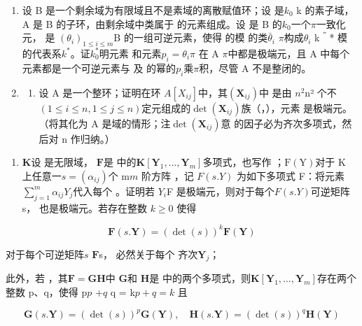 \begin{enumerate}
\def\labelenumi{\arabic{enumi}.}
\setcounter{enumi}{15}
\item
  设 B 是一个剩余域为有限域且不是素域的离散赋值环；设  是\(k_{0}\) k 的素子域，A 是 B 的子环，由剩余域中类属于  的元素组成。设  是 B 的\(k_{0}\)一个\(\pi\)一致化元， 是 \((\theta_{i})_{1\leq i\leq m}\)B 的一组可逆元素，使得  的模  的类\(\bar{\theta}_{i}\)  \(\pi\)构成\(\theta_{i}\) k＾* 模  的代表系\(k^{*}\)。证\(k_{0}^{*}\)明元素  和元素\(p_{i}=\theta_{i}\pi\)  在 A \(\pi\)中都是极端元，且 A 中每个元素都是一个可逆元素与  及  的幂的\(p_{i}\)乘\(\pi\)积，尽管 A 不是整闭的。
\item
  \begin{enumerate}
  \def\labelenumii{(\alph{enumii})}
  \tightlist
  \item
  设 A 是一个整环；证明在环  \(A[X_{ij}]\)中，其\((\mathbf{X}_{ij})\)中  是由 \(n^{2}\)n² 个不\((1 \leqslant i \leqslant n, 1 \leqslant j \leqslant n)\)定元组成的\(\det(\mathbf{X}_{ij})\)族（，），元素  是极端元。（将其化为 A 是域的情形；注\(\det(\mathbf{X}_{ij})\)意  的因子必为齐次多项式，然后对 n 作归纳。）
  \end{enumerate}
\end{enumerate}

\begin{enumerate}
\def\labelenumi{(\alph{enumi})}
\setcounter{enumi}{1}
\tightlist
\item
  \(\mathbf{K}\)设  是无限域， \(\mathbf{F}\)是  中的\(\mathbf{K}[\mathbf{Y}_1,\dots ,\mathbf{Y}_m]\)多项式，也写作 ；\(\mathrm{F(Y)}\)对于 K 上任意一\(s = (\alpha_{ij})\)个 m\(m\) 阶方阵 ，记 \(F(s.Y)\) 为如下多项式 F：将元素  \(\sum_{j=1}^{m}\alpha_{ij}Y_{j}\)代入每个 。证明若 \(Y_{i}\)F 是极端元，则对于每个\(F(s.Y)\)可逆矩阵 s， 也是极端元。若存在整数 \(k\geqslant0\) 使得
\end{enumerate}

\[
\mathbf {F} (s. \mathbf {Y}) = (\det (s)) ^ {k} \mathbf {F} (\mathbf {Y})
\]

对于每个可逆矩阵\(s\) \(\mathbf{F}\)s， 必然关于每个  齐次\(\mathbf{Y}_j\)；

此外，若 ，其\(\mathbf{F} = \mathbf{GH}\)中  \(\mathbf{G}\)和  \(\mathbf{H}\)是  中的两个多项式，则\(\mathbf{K}[\mathbf{Y}_1,\dots ,\mathbf{Y}_m]\)存在两个整数 p、q，使得 p\(p\) +\(q\) q = k\(p + q = k\) 且

\[
\mathbf {G} (s. \mathbf {Y}) = (\det (s)) ^ {p} \mathbf {G} (\mathbf {Y}), \quad \mathbf {H} (s. \mathbf {Y}) = (\det (s)) ^ {q} \mathbf {H} (\mathbf {Y})
\]

